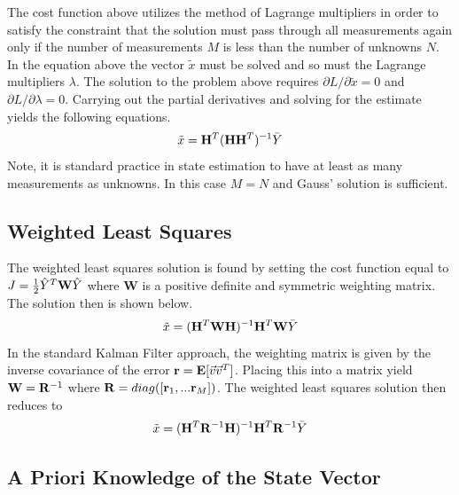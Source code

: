 The cost function above utilizes the method of Lagrange multipliers in
order to satisfy the constraint that the solution must pass through
all measurements again only if the number of measurements $M$ is less than
the number of unknowns $N$. In the equation above the vector
$\tilde{x}$ must be solved and so must the Lagrange multipliers
$\lambda$. The solution to the problem above requires
$\partial L / \partial \tilde{x} = 0$ and $\partial L / \partial \lambda = 0$. Carrying out the partial derivatives and solving for the estimate
yields the following equations. 
\begin{equation}
  \tilde{x} = {\bf H}^T({\bf H}{\bf H}^T)^{-1}\bar{Y}
\end{equation}
Note, it is standard practice in state estimation to have at least as
many measurements as unknowns. In this case $M=N$ and Gauss' solution
is sufficient. 

\subsection{Weighted Least Squares}

The weighted least squares solution is found by setting the cost
function equal to $J = \frac{1}{2}\hat{Y}^T{\bf W}\hat{Y}$
where {\bf W} is a positive definite and symmetric weighting matrix. The solution then is
shown below.
\begin{equation}\label{e:weights}
  \tilde{x} = ({\bf H}^T{\bf W}{\bf H})^{-1}{\bf H}^T{\bf W}\bar{Y}
\end{equation}
In the standard Kalman Filter approach, the weighting matrix is given
by the inverse covariance of the error ${\bf r} = {\bf
  E}[\vec{v}\vec{v}^T]$. Placing this into a matrix yield ${\bf W} =
{\bf R}^{-1}$ where ${\bf R} = diag([{\bf r}_1,...{\bf r}_M])$.  
The weighted least squares solution then reduces to
\begin{equation}
  \tilde{x} = ({\bf H}^T{\bf R}^{-1}{\bf H})^{-1}{\bf H}^T{\bf R}^{-1}\bar{Y}
\end{equation}

\subsection{A Priori Knowledge of the State Vector}

